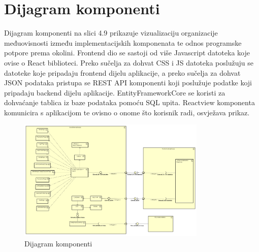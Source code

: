 			\eject
			
		\section{Dijagram komponenti}

			
			\indent Dijagram komponenti na slici 4.9 prikazuje vizualizaciju organizacije međuovisnosti između implementacijskih komponenata te odnos programske potpore prema okolini. Frontend dio se sastoji od više Javascript datoteka koje ovise o React biblioteci. Preko sučelja za dohvat CSS i JS datoteka poslužuju se datoteke koje pripadaju frontend dijelu aplikacije, a preko sučelja za dohvat JSON podataka pristupa se REST API komponenti koji poslužuje podatke koji pripadaju backend dijelu aplikacije. EntityFrameworkCore se koristi za dohvaćanje tablica iz baze podataka pomoću SQL upita. Reactview komponenta komunicira s aplikacijom te ovisno o onome što korisnik radi, osvježava prikaz.  \\
			
			\begin{figure}[H]
				\centering
				\includegraphics[width=0.8\textwidth]{dijagrami/ComponentDiagram.png}
				\caption{Dijagram komponenti}
				\label{fig:your_label}
			\end{figure}
			
			\eject
		
